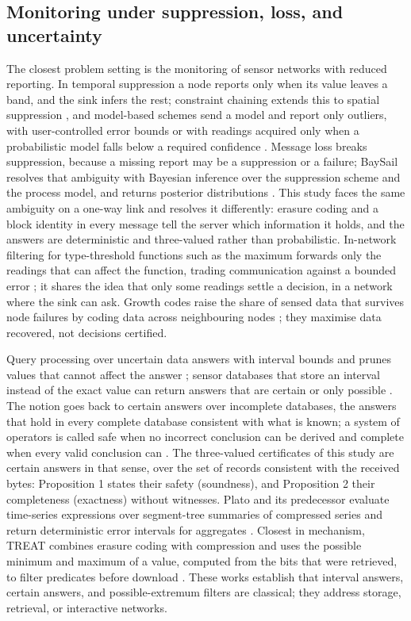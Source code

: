 \subsection{Monitoring under suppression, loss, and uncertainty}
The closest problem setting is the monitoring of sensor networks with reduced reporting. In temporal suppression a node reports only when its value leaves a band, and the sink infers the rest; constraint chaining extends this to spatial suppression \citep{silberstein2006conch}, and model-based schemes send a model and report only outliers, with user-controlled error bounds \citep{tulone2006paq} or with readings acquired only when a probabilistic model falls below a required confidence \citep{deshpande2004model}. Message loss breaks suppression, because a missing report may be a suppression or a failure; BaySail resolves that ambiguity with Bayesian inference over the suppression scheme and the process model, and returns posterior distributions \citep{silberstein2007baysail}. This study faces the same ambiguity on a one-way link and resolves it differently: erasure coding and a block identity in every message tell the server which information it holds, and the answers are deterministic and three-valued rather than probabilistic. In-network filtering for type-threshold functions such as the maximum forwards only the readings that can affect the function, trading communication against a bounded error \citep{riva2014filtering}; it shares the idea that only some readings settle a decision, in a network where the sink can ask. Growth codes raise the share of sensed data that survives node failures by coding data across neighbouring nodes \citep{kamra2006growth}; they maximise data recovered, not decisions certified.

Query processing over uncertain data answers with interval bounds and prunes values that cannot affect the answer \citep{cheng2003probabilistic}; sensor databases that store an interval instead of the exact value can return answers that are certain or only possible \citep{cheng2003managing}. The notion goes back to certain answers over incomplete databases, the answers that hold in every complete database consistent with what is known; a system of operators is called safe when no incorrect conclusion can be derived and complete when every valid conclusion can \citep{imielinski1984}. The three-valued certificates of this study are certain answers in that sense, over the set of records consistent with the received bytes: Proposition 1 states their safety (soundness), and Proposition 2 their completeness (exactness) without witnesses. Plato and its predecessor evaluate time-series expressions over segment-tree summaries of compressed series and return deterministic error intervals for aggregates \citep{brito2017platodb,lin2019plato}. Closest in mechanism, TREAT combines erasure coding with compression and uses the possible minimum and maximum of a value, computed from the bits that were retrieved, to filter predicates before download \citep{taurone2024treat}. These works establish that interval answers, certain answers, and possible-extremum filters are classical; they address storage, retrieval, or interactive networks.

